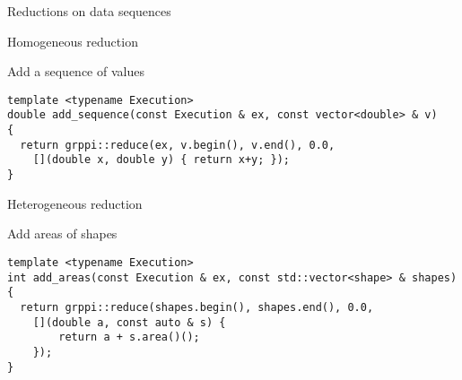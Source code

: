 \begin{frame}[t]{Reductions on data sequences}
\begin{itemize}
\end{itemize}
\end{frame}

\begin{frame}[t,fragile]{Homogeneous reduction}
\begin{block}{Add a sequence of values}
\begin{lstlisting}
template <typename Execution>
double add_sequence(const Execution & ex, const vector<double> & v)
{
  return grppi::reduce(ex, v.begin(), v.end(), 0.0,
    [](double x, double y) { return x+y; });
}
\end{lstlisting}
\end{block}
\end{frame}

\begin{frame}[t,fragile]{Heterogeneous reduction}
\begin{block}{Add areas of shapes}
\begin{lstlisting}
template <typename Execution>
int add_areas(const Execution & ex, const std::vector<shape> & shapes)
{
  return grppi::reduce(shapes.begin(), shapes.end(), 0.0,
    [](double a, const auto & s) { 
        return a + s.area()(); 
    });
}
\end{lstlisting}
\end{block}
\end{frame}

